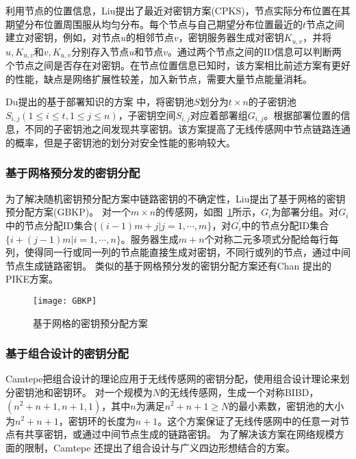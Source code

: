 利用节点的位置信息，Liu提出了最近对密钥方案(CPKS)，节点实际分布位置在其期望分布位置周围服从均匀分布。每个节点与自己期望分布位置最近的$t$节点之间建立对密钥，例如，对节点$u$的相邻节点$v$，密钥服务器生成对密钥$K_{u,v}$，并将$u,K_{u,v}$和$v,K_{u,v}$分别存入节点$u$和节点$v$。通过两个节点之间的ID信息可以判断两个节点之间是否存在对密钥。在节点位置信息已知时，该方案相比前述方案有更好的性能，缺点是网络扩展性较差，加入新节点，需要大量节点能量消耗。

Du提出的基于部署知识的方案 中，将密钥池$S$划分为$t\times n$的子密钥池$S_{i,j}(1\leq i\leq t,1\leq j\leq n)$，子密钥空间$S_{i,j}$对应着部署组$G_{i,j}$。根据部署位置的信息，不同的子密钥池之间发现共享密钥。该方案提高了无线传感网中节点链路连通的概率，但是子密钥池的划分对安全性能的影响较大。


\subsubsection{基于网格预分发的密钥分配}
为了解决随机密钥预分配方案中链路密钥的不确定性，Liu提出了基于网格的密钥预分配方案(GBKP)。
对一个$m\times n$的传感网，如图~\ref{fig:GBKP}所示，$G_i$为部署分组。对$G_i$中的节点分配ID集合$\{(i-1)m+j|j=1,\cdots,m\}$，对$G_i^{'}$中的节点分配ID集合$\{i+(j-1)m|i=1,\cdots,n\}$。服务器生成$m+n$个对称二元多项式分配给每行每列，使得同一行或同一列的节点能直接生成对密钥，不同行或列的节点，通过中间节点生成链路密钥。
类似的基于网格预分发的密钥分配方案还有Chan 提出的PIKE方案。
\begin{figure}[htbp]
  \centering
  \texttt{[image: GBKP]}
  \caption{基于网格的密钥预分配方案}
  \label{fig:GBKP}
\end{figure}

\subsubsection{基于组合设计的密钥分配}
Camtepe把组合设计的理论应用于无线传感网的密钥分配，使用组合设计理论来划分密钥池和密钥环。
对一个规模为$N$的无线传感网，生成一个对称BIBD，$(n^2+n+1,n+1,1)$，其中$n$为满足$n^2+n+1\geq N$的最小素数，密钥池的大小为$n^2+n+1$，密钥环的长度为$n+1$。这个方案保证了无线传感网中的任意一对节点有共享密钥，或通过中间节点生成的链路密钥。
为了解决该方案在网络规模方面的限制，Camtepe 还提出了组合设计与广义四边形想结合的方案。



